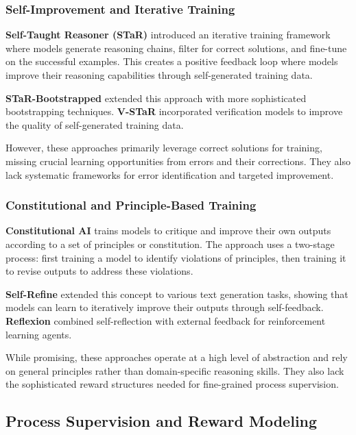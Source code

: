 \documentclass[10pt,twocolumn]{article}
\begin{document}
\subsubsection{Self-Improvement and Iterative Training}

\textbf{Self-Taught Reasoner (STaR)} \cite{zelikman2022star} introduced an iterative training framework where models generate reasoning chains, filter for correct solutions, and fine-tune on the successful examples. This creates a positive feedback loop where models improve their reasoning capabilities through self-generated training data.

\textbf{STaR-Bootstrapped} \cite{zelikman2022star} extended this approach with more sophisticated bootstrapping techniques. \textbf{V-STaR} \cite{hosseini2024v} incorporated verification models to improve the quality of self-generated training data.

However, these approaches primarily leverage correct solutions for training, missing crucial learning opportunities from errors and their corrections. They also lack systematic frameworks for error identification and targeted improvement.

\subsubsection{Constitutional and Principle-Based Training}

\textbf{Constitutional AI} \cite{bai2022constitutional} trains models to critique and improve their own outputs according to a set of principles or constitution. The approach uses a two-stage process: first training a model to identify violations of principles, then training it to revise outputs to address these violations.

\textbf{Self-Refine} \cite{madaan2023self} extended this concept to various text generation tasks, showing that models can learn to iteratively improve their outputs through self-feedback. \textbf{Reflexion} \cite{shinn2023reflexion} combined self-reflection with external feedback for reinforcement learning agents.

While promising, these approaches operate at a high level of abstraction and rely on general principles rather than domain-specific reasoning skills. They also lack the sophisticated reward structures needed for fine-grained process supervision.

\subsection{Process Supervision and Reward Modeling}
\end{document}
